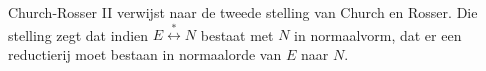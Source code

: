   Church-Rosser II verwijst naar de tweede stelling van Church en Rosser. Die stelling zegt dat indien $E \stackrel{*}{\longleftrightarrow} N$  bestaat met $N$ in normaalvorm, dat er een reductierij moet bestaan in normaalorde van $E$ naar $N$.